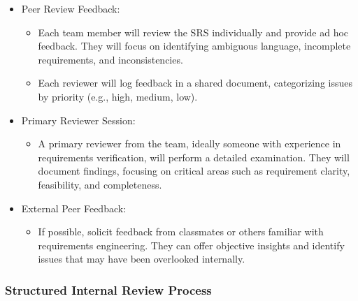 \documentclass[12pt, titlepage]{article}
\begin{document}
\begin{itemize}
	\item Peer Review Feedback:
	\begin{itemize}
		\item Each team member will review the SRS individually and provide ad hoc feedback. They will focus on identifying ambiguous language, incomplete requirements, and inconsistencies.
		\item Each reviewer will log feedback in a shared document, categorizing issues by priority (e.g., high, medium, low).
	\end{itemize}
	\item Primary Reviewer Session:
	\begin{itemize}
		\item A primary reviewer from the team, ideally someone with experience in requirements verification, will perform a detailed examination. They will document findings, focusing on critical areas such as requirement clarity, feasibility, and completeness.
	\end{itemize}
	\item External Peer Feedback:
	\begin{itemize}
		\item If possible, solicit feedback from classmates or others familiar with requirements engineering. They can offer objective insights and identify issues that may have been overlooked internally.
	\end{itemize}
\end{itemize}

\newpage

\subsubsection{Structured Internal Review Process}
\end{document}
